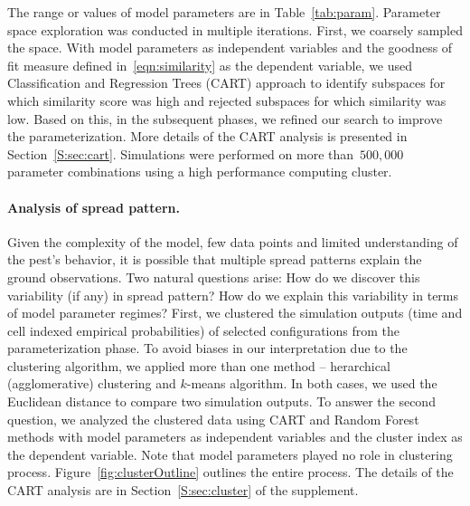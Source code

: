 \documentclass[11pt]{article}
\theoremstyle{definition}
\begin{document}
The range or values of model parameters are in Table~\ref{tab:param}.
Parameter space exploration was conducted in multiple iterations.  First,
we coarsely sampled the space. With model parameters as independent
variables and the goodness of fit measure defined in~\eqref{eqn:similarity}
as the dependent variable, we used Classification and Regression Trees
(CART) approach to identify subspaces for which similarity score was high
and rejected subspaces for which similarity was low. Based on this, in the
subsequent phases, we refined our search to improve the parameterization.
More details of the CART analysis is presented in Section~\ref{S:sec:cart}.
Simulations were performed on more than~$500,000$ parameter combinations
using a high performance computing cluster.


\paragraph{Analysis of spread pattern.}
Given the complexity of the model, few data points and limited
understanding of the pest's behavior, it is possible that multiple spread
patterns explain the ground observations. Two natural questions arise: How
do we discover this variability (if any) in spread pattern? How do we
explain this variability in terms of model parameter regimes?  First, we
clustered the simulation outputs (time and cell indexed empirical
probabilities) of selected configurations from the parameterization phase.
To avoid biases in our interpretation due to the clustering algorithm, we
applied more than one method -- herarchical (agglomerative) clustering and
$k$-means algorithm. In both cases, we used the Euclidean distance to
compare two simulation outputs. To answer the second question, we analyzed
the clustered data using CART and Random Forest methods with model
parameters as independent variables and the cluster index as the dependent
variable.  Note that model parameters played no role in clustering process.
Figure~\ref{fig:clusterOutline} outlines the entire process. The details of
the CART analysis are in Section~\ref{S:sec:cluster} of the supplement.
\end{document}
